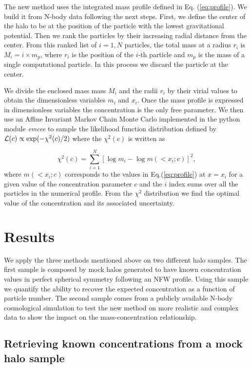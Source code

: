 \documentclass{emulateapj}
\begin{document}
The new method uses the integrated mass profile defined in
Eq. (\ref{eq:profile}).  We build it from N-body data following the
next steps.  First, we define the center of the halo to be at the
position of the particle with the lowest gravitational potential.
Then we rank the particles by their increasing radial distance from
the center.  From this ranked list of $i=1,N$ particles, the total
mass at a radius $r_i$ is $M_i=i\times m_p$, where $r_i$ is the
position of the $i$-th particle and $m_p$ is the mass of a single
computational particle.  In this process we discard the particle at
the center.

We divide the enclosed mass mass $M_i$ and the radii $r_i$ by their
virial values to obtain the dimensionless variables $m_i$ and $x_i$.
Once the mass profile is expressed in dimensionless variables the
concentration is the only free parameter.  We then use an Affine
Invariant Markov Chain Monte Carlo implemented in the python module
{\em emcee} \citep{emcee} to sample the likelihood function
distribution defined by ${\cal L}(c)\propto \exp(-\chi^2(c)/2)$ where
the $\chi^2(c)$ is written as

\begin{equation}
\chi^2(c)= \sum_{i=1}^{N}[\log m_i - \log m(< x_i;c)]^2,
\end{equation}
%
where $m(<x_i;c)$ corresponds to the values in Eq.(\ref{eq:profile})
at $x=x_i$ for a given value of the concentration parameter $c$ and
the $i$ index sums over all the particles in the numerical profile.
From the $\chi^2$ distribution we find the optimal value of the
concentration and its associated uncertainty.


\section{Results}
\label{sec:results}

We apply the three methods mentioned above on two different halo
samples.  The first sample is composed by mock halos generated to have
known concentration values in perfect spherical symmetry following an
NFW profile.  Using this sample we quantify the ability to recover the
expected concentration as a function of particle number.  The second
sample comes from a publicly available N-body cosmological simulation
to test the new method on more realistic and complex data to show the
impact on the mass-concentration relationship.


\subsection{Retrieving known concentrations from a mock halo sample}
\end{document}
